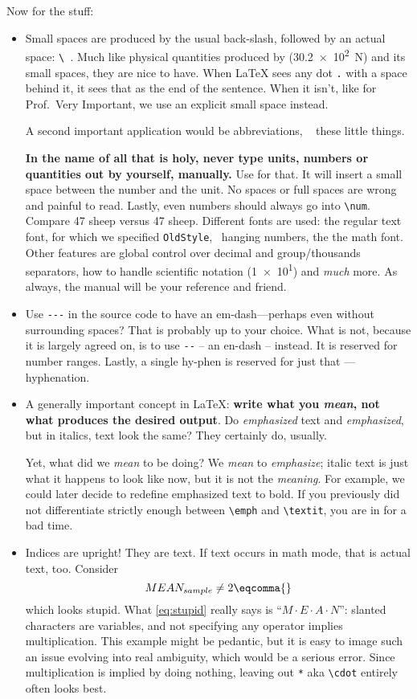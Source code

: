 Now for the stuff:
\begin{itemize}
	\item Small spaces are produced by the usual back-slash, followed by an actual space: \verb|\ |.
	Much like physical quantities produced by  (\SI{30.2e2}{\newton}) and its small spaces, they are nice to have.
	When \LaTeX{} sees any dot \verb|.| with a space behind it, it sees that as the end of the sentence.
	When it isn't, like for Prof.\ Very Important, we use an explicit small space instead.
	
	A second important application would be abbreviations, \ \textleftarrow{} these little things.
	
	\textbf{In the name of all that is holy, never type units, numbers or quantities out by yourself, manually.}
	Use  for that.
	It will insert a small space between the number and the unit.
	No spaces or full spaces are wrong and painful to read.
	Lastly, even numbers should always go into \verb|\num|.
	Compare 47 sheep versus \num{47} sheep.
	Different fonts are used: the regular text font, for which we specified \verb|OldStyle|, \ hanging numbers, the the math font.
	Other features are global control over decimal and group/thousands separators, how to handle scientific notation (\num{1e1}) and \emph{much} more.
	As always, the manual will be your reference and friend.
	\item Use \verb|---| in the source code to have an em-dash---perhaps even without surrounding spaces?
	That is probably up to your choice.
	What is not, because it is largely agreed on, is to use \verb|--| -- an en-dash -- instead.
	It is reserved for number ranges.
	Lastly, a single hy-phen is reserved for just that --- hyphenation.
	\item A generally important concept in \LaTeX{}:
	\textbf{write what you \emph{mean}, not what produces the desired output}.
	Do \emph{emphasized} text and \textit{emphasized}, but in italics, text look the same?
	They certainly do, usually.
	
	Yet, what did we \emph{mean} to be doing?
	We \emph{mean} to \emph{emphasize}; italic text is just what it happens to look like now, but it is not the \emph{meaning}.
	For example, we could later decide to redefine emphasized text to bold.
	If you previously did not differentiate strictly enough between \verb|\emph| and \verb|\textit|, you are in for a bad time.
	\item Indices are upright!
	They are text.
	If text occurs in math mode, that is actual text, too.
	Consider
	\begin{equation}\label{eq:stupid}
		MEAN_{sample} \neq 2\eqcomma{}
	\end{equation}
	which looks stupid.
	What \cref{eq:stupid} really says is \enquote{\(M \cdot E \cdot A \cdot N\)}: slanted characters are variables, and not specifying any operator implies multiplication.
	This example might be pedantic, but it is easy to image such an issue evolving into real ambiguity, which would be a serious error.
	Since multiplication is implied by doing nothing, leaving out \verb|*| aka \verb|\cdot| entirely often looks best.
	

\end{itemize}
